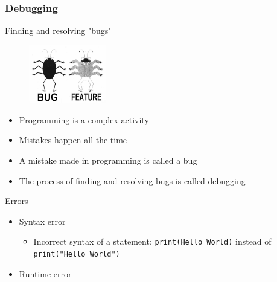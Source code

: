 \documentclass[10pt, a4paper]{beamer} %
\begin{document}
\begin{frame}[c,allowframebreaks]\frametitle{Debugging}
  \begin{block}{Finding and resolving "bugs"}
    \begin{figure}
      \centering
      \includegraphics[width=0.3\textwidth]{pics/bugvsfeature.jpg}
    \end{figure}
    \begin{itemize}
      \item Programming is a complex activity
      \item Mistakes happen all the time
      \item A mistake made in programming is called a bug
      \item The process of finding and resolving bugs is called debugging
    \end{itemize}
  \end{block}

  \begin{block}{Errors}
    \begin{itemize}
      \item Syntax error
            \begin{itemize}
              \item Incorrect syntax of a statement: \lstinline!print(Hello World)! instead of \lstinline!print("Hello World")!
            \end{itemize}
      \item Runtime error


\end{itemize}
\end{block}
\end{frame}
\end{document}
